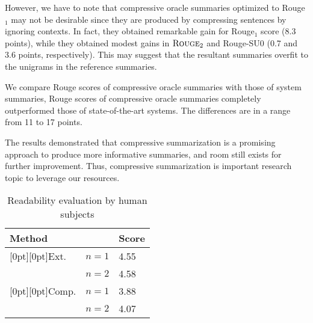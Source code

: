 \documentclass[11pt,a4paper]{article}
\begin{document}
However, we have to note that compressive oracle summaries optimized
to {\sc Rouge}$_1$ may not be desirable since they are produced by
compressing sentences by
ignoring contexts.
In fact, they obtained remarkable gain for {\sc Rouge}$_1$ score (8.3 points),
while they obtained modest gains in $\text{\sc Rouge}_2$ and {\sc
Rouge}-SU0 (0.7 and 3.6 points, respectively).
This may suggest that the resultant summaries overfit to the unigrams in
the reference summaries.

We compare {\sc Rouge} scores of compressive oracle summaries with
 those of system summaries, {\sc Rouge} scores of compressive oracle
 summaries completely outperformed those of state-of-the-art systems.
The differences are in a range from 11 to 17 points. 

The results demonstrated that compressive summarization is a promising 
approach to produce more informative summaries, 
and room still exists for further improvement.
Thus, compressive summarization is important research topic to leverage
our resources.
\begin{table}[tb]
 \begin{center}
  \begin{tabular}{ll|l}
    \multicolumn{2}{l|}{Method} & Score\\
   \hline
    \raisebox{-1.8ex}[0pt][0pt]{Ext.} & $n{=}1$ & 4.55\\
                                     & $n{=}2$ & 4.58 \\
   \hline
    \raisebox{-1.8ex}[0pt][0pt]{Comp.} & $n{=}1$ & 3.88\\
                                     & $n{=}2$ & 4.07 \\
  \end{tabular}
  \caption{Readability evaluation by human subjects}
  \label{subjective_eval}
 \end{center}
\end{table}
\end{document}

